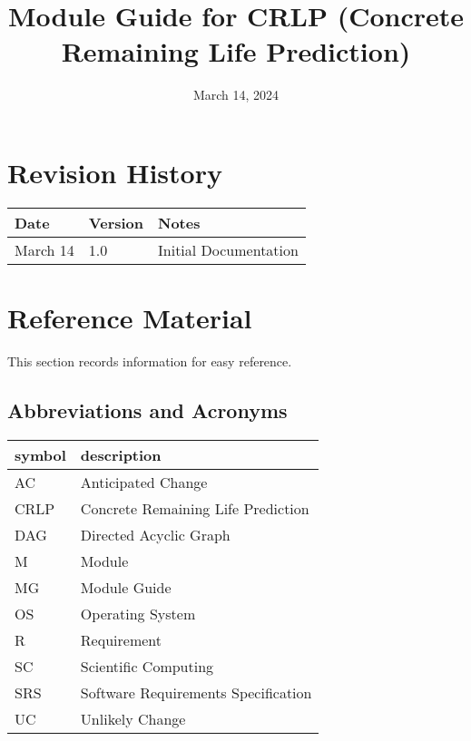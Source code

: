 \documentclass[12pt, titlepage]{article}
\begin{document}
\title{Module Guide for CRLP (Concrete Remaining Life Prediction)}
\author{\authname}
\date{March 14, 2024}

\maketitle
{}

\section{Revision History}

\begin{tabularx}{\textwidth}{p{3cm}p{2cm}X}
\toprule {\bf Date} & {\bf Version} & {\bf Notes}\\
\midrule
March 14 & 1.0 & Initial Documentation\\
\bottomrule
\end{tabularx}

\newpage

\section{Reference Material}

This section records information for easy reference.

\subsection{Abbreviations and Acronyms}

\renewcommand{\arraystretch}{1.2}
\begin{tabular}{l l} 
  \toprule		
  \textbf{symbol} & \textbf{description}\\
  \midrule 
  AC & Anticipated Change\\
  CRLP & Concrete Remaining Life Prediction \\
  DAG & Directed Acyclic Graph \\
  M & Module \\
  MG & Module Guide \\
  OS & Operating System \\
  R & Requirement\\
  SC & Scientific Computing \\
  SRS & Software Requirements Specification\\
  UC & Unlikely Change \\
  \bottomrule
\end{tabular}\\
\end{document}
